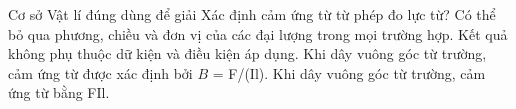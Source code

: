 \begin{ex}
Cơ sở Vật lí đúng dùng để giải Xác định cảm ứng từ từ phép đo lực từ?
\choice
{Có thể bỏ qua phương, chiều và đơn vị của các đại lượng trong mọi trường hợp.}
{Kết quả không phụ thuộc dữ kiện và điều kiện áp dụng.}
{\True Khi dây vuông góc từ trường, cảm ứng từ được xác định bởi $B$ = F/(Il).}
{Khi dây vuông góc từ trường, cảm ứng từ bằng FIl.}
\end{ex}
